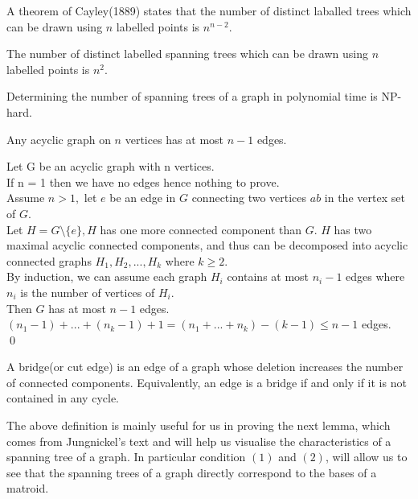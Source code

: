 \documentclass[../main.tex]{subfiles}
\begin{document}
\begin{prop}
 A theorem of Cayley(1889) states that the number of distinct laballed trees which can be drawn using $n$ labelled points is $ n^{n-2}$.
 \end{prop}

\begin{cor}
The number of distinct labelled spanning trees which can be drawn using $n$ labelled points is $n^2.$ 
\end{cor}

\begin{rem}
Determining the number of spanning trees of a graph in polynomial time is NP-hard.
\end{rem}

\begin{lem}\cite{jungnickel}
Any acyclic graph on $n$ vertices has at most $n-1$ edges.
\end{lem}
\noindent\Proof Let G be an acyclic graph with n vertices.\\
\noindent If n = 1 then we have no edges hence nothing to prove.\\
\noindent Assume $n>1,$ let $e$ be an edge in $G$ connecting two vertices $ab$ in the vertex set of $G.$\\
\noindent Let $H = G \setminus \{e\}, H$ has one more connected component than $G.$ $H$ has two maximal acyclic connected components, and thus can be decomposed into acyclic connected graphs $H_1, H_2, ..., H_k$ where $k \geq 2.$\\
\noindent By induction, we can assume each graph $H_i$ contains at most $n_i - 1$ edges where $n_i$ is the number of vertices of $H_i.$\\
\noindent Then $G$ has at most $n-1$ edges.\\
\noindent $(n_1 - 1) + ... + (n_k - 1) + 1 = (n_1 + ... + n_k) - (k - 1) \leq n - 1$ edges.
\\ \qed

\begin{defn}[Bridge]
A bridge(or cut edge) is an edge of a graph whose deletion increases the number of connected components. Equivalently, an edge is a bridge if and only if it is not contained in any cycle.
\end{defn}

\noindent The above definition is mainly useful for us in proving the next lemma, which comes from Jungnickel's text and will help us visualise the characteristics of a spanning tree of a graph. In particular condition $(1)$ and $(2)$, will allow us to see that the spanning trees of a graph directly correspond to the bases of a matroid.
\end{document}
